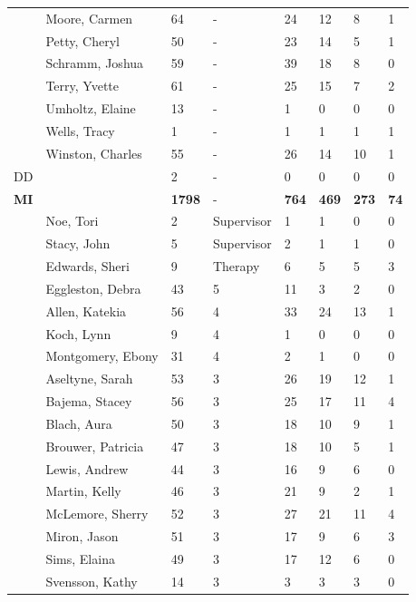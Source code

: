 \documentclass{article}\usepackage[]{graphicx}\usepackage[]{color}
\begin{document}
{\begin{longtable} { >{\raggedright}p{}p{}p{}p{}p{}p{}p{}p{}}
   & Moore, Carmen & 64 & - & 24 & 12 & 8 & 1 \\ 
   \rowcolor[gray]{0.90} & Petty, Cheryl & 50 & - & 23 & 14 & 5 & 1 \\ 
   \rowcolor[gray]{0.90} & Schramm, Joshua & 59 & - & 39 & 18 & 8 & 0 \\ 
   \rowcolor[gray]{0.90} & Terry, Yvette & 61 & - & 25 & 15 & 7 & 2 \\ 
   & Umholtz, Elaine & 13 & - & 1 & 0 & 0 & 0 \\ 
   & Wells, Tracy & 1 & - & 1 & 1 & 1 & 1 \\ 
   & Winston, Charles & 55 & - & 26 & 14 & 10 & 1 \\ 
   \hline
DD &  & 2 & - & 0 & 0 & 0 & 0 \\ 
   \hline
\textbf{MI} &  & \textbf{1798} & - & \textbf{764} & \textbf{469} & \textbf{273} & \textbf{74} \\ 
   \rowcolor[gray]{0.90} & Noe, Tori & 2 & Supervisor & 1 & 1 & 0 & 0 \\ 
   & Stacy, John & 5 & Supervisor & 2 & 1 & 1 & 0 \\ 
   & Edwards, Sheri & 9 & Therapy & 6 & 5 & 5 & 3 \\ 
   & Eggleston, Debra & 43 & 5 & 11 & 3 & 2 & 0 \\ 
   \rowcolor[gray]{0.90} & Allen, Katekia & 56 & 4 & 33 & 24 & 13 & 1 \\ 
   \rowcolor[gray]{0.90} & Koch, Lynn & 9 & 4 & 1 & 0 & 0 & 0 \\ 
   \rowcolor[gray]{0.90} & Montgomery, Ebony & 31 & 4 & 2 & 1 & 0 & 0 \\ 
   & Aseltyne, Sarah & 53 & 3 & 26 & 19 & 12 & 1 \\ 
   & Bajema, Stacey & 56 & 3 & 25 & 17 & 11 & 4 \\ 
   & Blach, Aura & 50 & 3 & 18 & 10 & 9 & 1 \\ 
   \rowcolor[gray]{0.90} & Brouwer, Patricia & 47 & 3 & 18 & 10 & 5 & 1 \\ 
   \rowcolor[gray]{0.90} & Lewis, Andrew & 44 & 3 & 16 & 9 & 6 & 0 \\ 
   \rowcolor[gray]{0.90} & Martin, Kelly & 46 & 3 & 21 & 9 & 2 & 1 \\ 
   & McLemore, Sherry & 52 & 3 & 27 & 21 & 11 & 4 \\ 
   & Miron, Jason & 51 & 3 & 17 & 9 & 6 & 3 \\ 
   & Sims, Elaina & 49 & 3 & 17 & 12 & 6 & 0 \\ 
   \rowcolor[gray]{0.90} & Svensson, Kathy & 14 & 3 & 3 & 3 & 3 & 0 \\ 

\end{longtable}}
\end{document}
